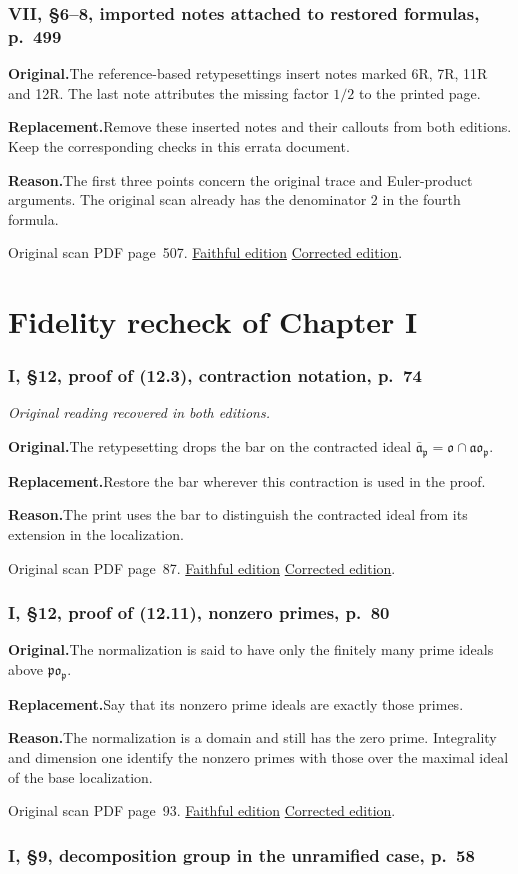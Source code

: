 \documentclass[11pt,a4paper]{article}
\newcommand{\original}{\par\smallskip\noindent\textbf{Original.}\enspace}
\newcommand{\replacement}{\par\smallskip\noindent\textbf{Replacement.}\enspace}
\newcommand{\reason}{\par\smallskip\noindent\textbf{Reason.}\enspace}
\newcommand{\editionlink}[3]{\href{#1\#errata.#2}{#3}}
\newcommand{\location}[2]{%
  \par\smallskip\noindent Original scan PDF page~#2.\enspace
  \editionlink{Neukirch_Faithful.pdf}{#1}{Faithful edition}
  \quad\editionlink{Neukirch_Corrected.pdf}{#1}{Corrected edition}.}
\begin{document}
\setcounter{section}{178}
\section{VII, \S6--8, imported notes attached to restored formulas, p.~499}\label{errata:item:179}

\original The reference-based retypesettings insert notes marked 6R, 7R, 11R and 12R. The last note attributes the missing factor $1/2$ to the printed page.
\replacement Remove these inserted notes and their callouts from both editions. Keep the corresponding checks in this errata document.
\reason The first three points concern the original trace and Euler-product arguments. The original scan already has the denominator $2$ in the fourth formula.
\location{179}{507}

\part{Fidelity recheck of Chapter I}
\setcounter{section}{179}
\section{I, \S12, proof of (12.3), contraction notation, p.~74}\label{errata:item:180}
\noindent\emph{Original reading recovered in both editions.}\par
\original The retypesetting drops the bar on the contracted ideal $\bar{\mathfrak a}_{\mathfrak p}=\mathfrak o\cap\mathfrak a\mathfrak o_{\mathfrak p}$.
\replacement Restore the bar wherever this contraction is used in the proof.
\reason The print uses the bar to distinguish the contracted ideal from its extension in the localization.
\location{180}{87}

\setcounter{section}{180}
\section{I, \S12, proof of (12.11), nonzero primes, p.~80}\label{errata:item:181}

\original The normalization is said to have only the finitely many prime ideals above $\mathfrak p\mathfrak o_{\mathfrak p}$.
\replacement Say that its nonzero prime ideals are exactly those primes.
\reason The normalization is a domain and still has the zero prime. Integrality and dimension one identify the nonzero primes with those over the maximal ideal of the base localization.
\location{181}{93}

\setcounter{section}{181}
\section{I, \S9, decomposition group in the unramified case, p.~58}\label{errata:item:182}
\end{document}

